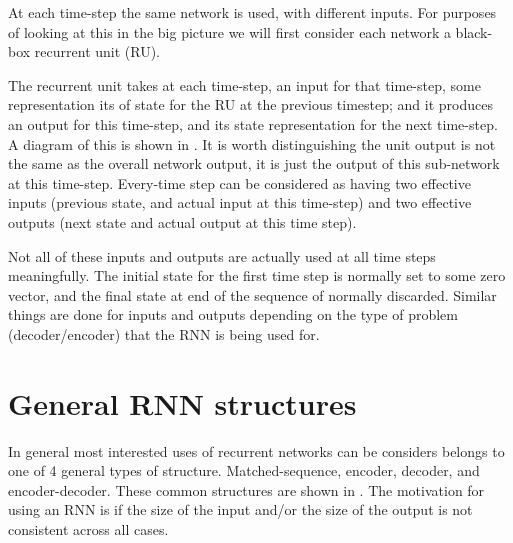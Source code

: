 \documentclass[12pt,parskip]{komatufte}
\begin{document}

At each time-step the same network is used, with different inputs.
For purposes of looking at this in the big picture we will first consider each network a black-box recurrent unit (RU).


The recurrent unit takes at each time-step, an input for that time-step, some representation its of state for the RU at the previous timestep; and it produces an output for this time-step, and its state representation for the next time-step.
A diagram of this is shown in .
It is worth distinguishing the unit output is not the same as the overall network output, it is just the output of this sub-network at this time-step.
Every-time step can be considered as having two effective inputs (previous state, and actual input at this time-step) and two effective outputs (next state and actual output at this time step).

Not all of these inputs and outputs are actually used at all time steps meaningfully.
The initial state for the first time step is normally set to some zero vector,
and the final state at end of the sequence of normally discarded.
Similar things are done for inputs and outputs depending on the type of problem (decoder/encoder) that the RNN is being used for.

\section{General RNN structures}
In general most interested uses of recurrent networks can be considers belongs to one of 4 general types of structure.
Matched-sequence, encoder, decoder, and encoder-decoder.
These common structures are shown in .
The motivation for using an RNN is if the size of the input and/or the size of the output is not consistent across all cases.
\end{document}
